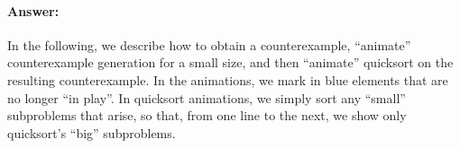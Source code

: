 \documentclass[a4paper]{article}
\begin{document}
\paragraph{Answer:}%
\newcommand*{\USED}[1]{{\color{blue}#1}}%
\newcommand{\HOLE}{{\rule[-.2ex]{1ex}{.4pt}}}%
\newcommand{\SWAP}{\leftrightarrow}%
\newcommand*{\argmedian}{\operatorname{argmedian}}%
\newcommand*{\set}[1]{\{#1\}}%
In the following, we describe how to obtain a counterexample, ``animate'' counterexample generation for a small size, and then ``animate'' quicksort on the resulting counterexample.
In the animations, we \USED{mark in blue} elements that are no longer ``in play''.
In quicksort animations, we simply sort any ``small'' subproblems that arise, so that, from one line to the next, we show only quicksort's ``big'' subproblems.
\begin{itemize}


\end{itemize}
\end{document}

